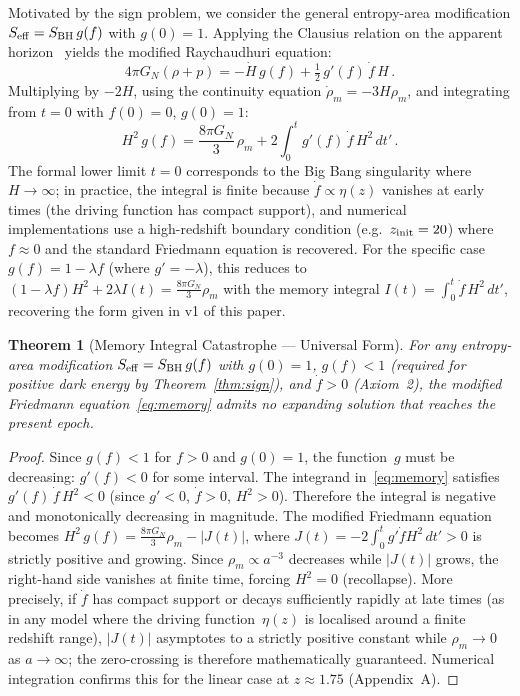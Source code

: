 \documentclass[12pt,a4paper]{article}
\newtheorem{theorem}{Theorem}
\theoremstyle{remark}
\begin{document}
Motivated by the sign problem, we consider the general entropy-area modification $S_{\rm eff} = S_{\rm BH}\,g(f)$ with $g(0) = 1$.
Applying the Clausius relation on the apparent horizon~\cite{CaiKim2005,AkbarCai2006} yields the modified Raychaudhuri equation:
\begin{equation}
4\pi G_N(\rho+p) = -\dot H\,g(f) + \tfrac{1}{2}\,g'(f)\,\dot f\,H\,.
\end{equation}
Multiplying by $-2H$, using the continuity equation $\dot\rho_m = -3H\rho_m$, and integrating from $t=0$ with $f(0)=0$, $g(0)=1$:
\begin{equation}\label{eq:memory}
H^2\,g(f) = \frac{8\pi G_N}{3}\,\rho_m + 2\int_0^t g'(f)\,\dot f\,H^2\,dt'\,.
\end{equation}
The formal lower limit $t = 0$ corresponds to the Big Bang singularity where $H\to\infty$; in practice, the integral is finite because $\dot f \propto \eta(z)$ vanishes at early times (the driving function has compact support), and numerical implementations use a high-redshift boundary condition (e.g.\ $z_{\rm init} = 20$) where $f \approx 0$ and the standard Friedmann equation is recovered.
For the specific case $g(f) = 1 - \lambda f$ (where $g' = -\lambda$), this reduces to $(1-\lambda f)H^2 + 2\lambda I(t) = \tfrac{8\pi G_N}{3}\rho_m$ with the memory integral $I(t) = \int_0^t \dot f\,H^2\,dt'$, recovering the form given in v1 of this paper.

\begin{theorem}[Memory Integral Catastrophe --- Universal Form]\label{thm:memory}
For \emph{any} entropy-area modification $S_{\rm eff} = S_{\rm BH}\,g(f)$ with $g(0) = 1$, $g(f) < 1$ (required for positive dark energy by Theorem~\ref{thm:sign}), and $\dot f > 0$ (Axiom~2), the modified Friedmann equation~\eqref{eq:memory} admits no expanding solution that reaches the present epoch.
\end{theorem}

\begin{proof}
Since $g(f) < 1$ for $f > 0$ and $g(0) = 1$, the function~$g$ must be decreasing: $g'(f) < 0$ for some interval.
The integrand in~\eqref{eq:memory} satisfies $g'(f)\,\dot f\,H^2 < 0$ (since $g' < 0$, $\dot f > 0$, $H^2 > 0$).
Therefore the integral is negative and monotonically decreasing in magnitude.
The modified Friedmann equation becomes $H^2\,g(f) = \tfrac{8\pi G_N}{3}\rho_m - |J(t)|$, where $J(t) = -2\int_0^t g'\dot f H^2\,dt' > 0$ is strictly positive and growing.
Since $\rho_m \propto a^{-3}$ decreases while $|J(t)|$ grows, the right-hand side vanishes at finite time, forcing $H^2 = 0$ (recollapse).
More precisely, if $\dot f$ has compact support or decays sufficiently rapidly at late times (as in any model where the driving function~$\eta(z)$ is localised around a finite redshift range), $|J(t)|$ asymptotes to a strictly positive constant while $\rho_m \to 0$ as $a\to\infty$; the zero-crossing is therefore mathematically guaranteed.
Numerical integration confirms this for the linear case at $z \approx 1.75$ (Appendix~A).
\end{proof}
\end{document}
